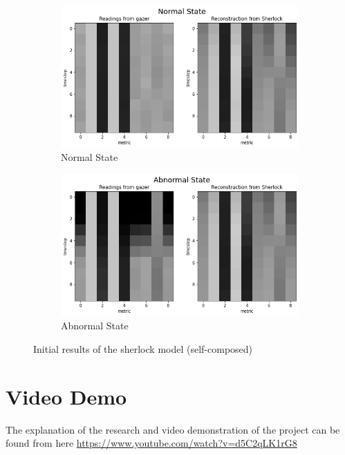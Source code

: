 \begin{figure}[H]
    \centering
    \begin{subfigure}[b]{0.7\textwidth}
        \centering
        \includegraphics[width=\textwidth]{assets/implementation/normal-state.png}
        \caption{Normal State}
        \label{fig:normal-state}
    \end{subfigure}
    \hfill
    \begin{subfigure}[b]{0.7\textwidth}
        \centering
        \includegraphics[width=\textwidth]{assets/implementation/abnormal-state.png}
        \caption{Abnormal State}
        \label{fig:abnormal-state}
    \end{subfigure}
    \hfill
       \caption{Initial results of the \ac{sherlock} model (self-composed)}
\end{figure}

\section{Video Demo}

The explanation of the research and video demonstration of the project can be found from here \href{https://www.youtube.com/watch?v=d5C2qLK1rG8}{https://www.youtube.com/watch?v=d5C2qLK1rG8}